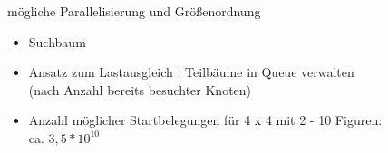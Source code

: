 \documentclass{beamer}
\begin{document}
\begin{frame}{mögliche Parallelisierung und Größenordnung}
\begin{itemize}

	\item Suchbaum
	\item Ansatz zum Lastausgleich : Teilbäume in Queue verwalten \\(nach Anzahl bereits besuchter Knoten)
	\item Anzahl möglicher Startbelegungen für 4 x 4 mit 2 - 10 Figuren: \\
		ca. $3,5 * 10^{10}$
\end{itemize}
\end{frame}

%

%
\end{document}
